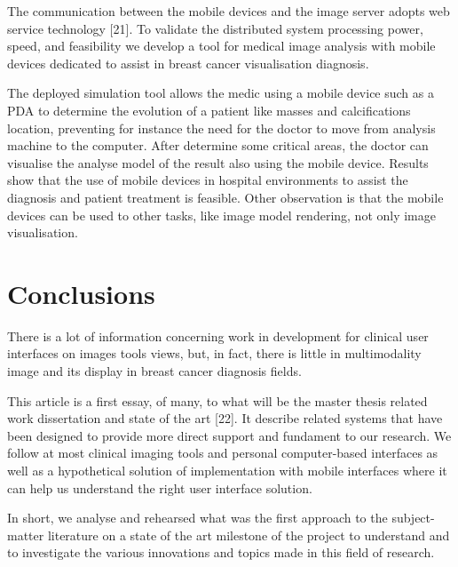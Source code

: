 \clearpage

The communication between the mobile devices and the image server adopts web service technology [21]. To validate the distributed system processing power, speed, and feasibility we develop a tool for medical image analysis with mobile devices dedicated to assist in breast cancer visualisation diagnosis.

The deployed simulation tool allows the medic using a mobile device such as a PDA to determine the evolution of a patient like masses and calcifications location, preventing for instance the need for the doctor to move from analysis machine to the computer. After determine some critical areas, the doctor can visualise the analyse model of the result also using the mobile device. Results show that the use of mobile devices in hospital environments to assist the diagnosis and patient treatment is feasible. Other observation is that the mobile devices can be used to other tasks, like image model rendering, not only image visualisation.

\section{Conclusions}

There is a lot of information concerning work in development for clinical user interfaces on images tools views, but, in fact, there is little in multimodality image and its display in breast cancer diagnosis fields.

This article is a first essay, of many, to what will be the master thesis related work dissertation and state of the art [22]. It describe related systems that have been designed to provide more direct support and fundament to our research. We follow at most clinical imaging tools and personal computer-based interfaces as well as a hypothetical solution of implementation with mobile interfaces where it can help us understand the right user interface solution.

In short, we analyse and rehearsed what was the first approach to the subject-matter literature on a state of the art milestone of the project to understand and to investigate the various innovations and topics made in this field of research.

\clearpage

